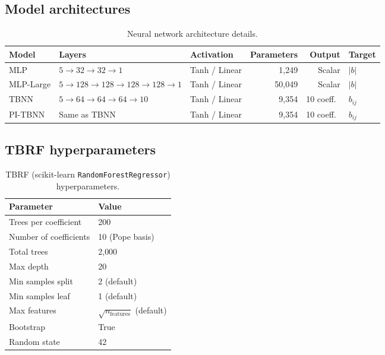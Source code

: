 \subsection{Model architectures}

\begin{table}[htbp]
\centering
\caption{Neural network architecture details.}
\label{tab:architectures}
\begin{tabular}{lllrrl}
\toprule
Model & Layers & Activation & Parameters & Output & Target \\
\midrule
MLP       & $5 \to 32 \to 32 \to 1$         & Tanh / Linear & 1{,}249  & Scalar   & $|b|$ \\
MLP-Large & $5 \to 128 \to 128 \to 128 \to 128 \to 1$ & Tanh / Linear & 50{,}049 & Scalar   & $|b|$ \\
TBNN      & $5 \to 64 \to 64 \to 64 \to 10$ & Tanh / Linear & 9{,}354  & 10 coeff.\ & $b_{ij}$ \\
PI-TBNN   & Same as TBNN                     & Tanh / Linear & 9{,}354  & 10 coeff.\ & $b_{ij}$ \\
\bottomrule
\end{tabular}
\end{table}

\subsection{TBRF hyperparameters}

\begin{table}[htbp]
\centering
\caption{TBRF (scikit-learn \texttt{RandomForestRegressor}) hyperparameters.}
\label{tab:tbrf_hyperparams}
\begin{tabular}{ll}
\toprule
Parameter & Value \\
\midrule
Trees per coefficient    & 200 \\
Number of coefficients   & 10 (Pope basis) \\
Total trees              & 2{,}000 \\
Max depth                & 20 \\
Min samples split        & 2 (default) \\
Min samples leaf         & 1 (default) \\
Max features             & $\sqrt{n_{\mathrm{features}}}$ (default) \\
Bootstrap                & True \\
Random state             & 42 \\
\bottomrule
\end{tabular}
\end{table}

